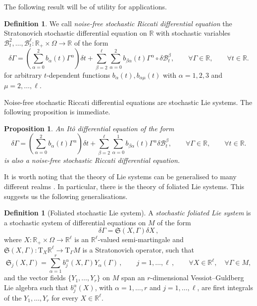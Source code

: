 \documentclass[11pt]{article}
\theoremstyle{plain}
\newtheorem{proposition}[theorem]{Proposition}
\theoremstyle{definition}
\newtheorem{definition}[theorem]{Definition}
\newcommand{\R}{\mathbb{R}}
\newcommand{\T}{\mathrm{T}}
\begin{document}
The following result will be of utility for applications.

\begin{definition} We call {\it noise-free stochastic Riccati differential equation}  the Stratonovich stochastic differential equation on $\mathbb{R}$ with stochastic variables $\mathcal{B}_t^2,\ldots,\mathcal{B}_t^\ell:\mathbb{R}_+\times \Omega\rightarrow \mathbb{R}$ of the form 
\begin{equation}\label{eq:NF_Stochastic_Riccati_Equation}
\delta \Gamma=\left(\sum_{\alpha=0}^2b_\alpha(t)\Gamma^\alpha\right)\delta t+\sum_{\beta=2}^\ell\sum_{\alpha=0}^2 b_{\beta\alpha}(t) \Gamma^\alpha\circ \delta \mathcal{B}^\beta_t,\qquad \forall \Gamma\in \mathbb{R},\qquad \forall t\in \mathbb{R}.
\end{equation}
for arbitrary $t$-dependent functions $b_\alpha(t),b_{\alpha\mu}(t)$ with $\alpha=1,2,3$ and $\mu=2,\ldots,\ell$. 
\end{definition}
Noise-free stochastic Riccati differential equations are stochastic Lie systems. The following proposition is immediate.
\begin{proposition}
An It\^{o} differential equation of the form 
$$
\delta \Gamma=\left(\sum_{\alpha=0}^2b_\alpha(t)\Gamma^\alpha\right)\delta t+\sum_{\beta=2}^\ell\sum_{\alpha=0}^1 b_{\beta\alpha}(t) \Gamma^\alpha \delta \mathcal{B}^\beta_t,\qquad \forall \Gamma\in \mathbb{R},\qquad \forall t\in \mathbb{R}.
$$
is also a noise-free stochastic Riccati differential equation.    
\end{proposition}

 It is worth noting that the theory of Lie systems can be generalised to many different realms \cite{Dissertationes,LS21}. In particular, there is the theory of foliated Lie systems. This suggests us the following generalisations.


\begin{definition}[Foliated stochastic Lie system]
    A {\it stochastic foliated Lie system} is a stochastic system of differential equations on $M$ of the form
  \begin{equation}
    \delta \Gamma = \mathfrak{S}(X, \Gamma) \delta X\,, \label{eq1bis2}
  \end{equation}
  where $X:\R_+ \times \Omega \rightarrow \mathbb{R}^\ell$ is an 
  $\mathbb{R}^\ell$-valued semi-martingale and $\mathfrak{S}(X, \Gamma) : \T_X \mathbb{R}^\ell
  \to \T_\Gamma M$ is a Stratonovich operator, such that 
\begin{equation}\label{decomposition with the Ys}
    \mathfrak{S}_j (X, \Gamma) = \sum_{\alpha = 1}^r b_j^\alpha (X,\Gamma) Y_\alpha (\Gamma)\,,\qquad j=1,\ldots,\ell\,,\qquad \forall X\in \mathbb{R}^\ell,\quad \forall \Gamma\in M,
    \end{equation}
and the vector fields $\{ Y_1, \ldots, Y_r \}$ on $M$ span an $r$-dimensional Vessiot--Guldberg Lie algebra such that
$b^\alpha_j(X)$, with $\alpha=1,\ldots,r$ and $j=1,\ldots,\ell$, are first integrals of the $Y_1,\ldots,Y_r$ for every $X\in \mathbb{R}^\ell$. 
\end{definition}
\end{document}
